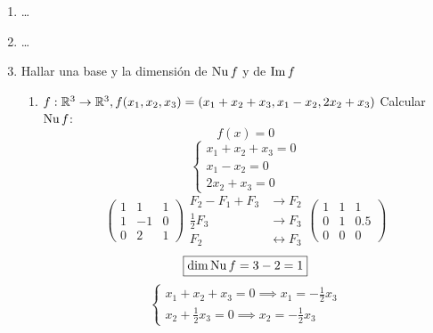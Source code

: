 \documentclass[../practica.root.tex]{subfiles}
\begin{document}
\begin{enumerate}
\begin{enumerate}
          \end{enumerate}
    \item \dots
    \item \dots
    \item Hallar una base y la dimensión de \(\operatorname{Nu} f\) y de \(\operatorname{Im} f\)
          \begin{enumerate}
              \item \( f : \mathbb{R}^3 \to \mathbb{R}^3, f(x_1,x_2,x_3) = (x_1 + x_2 + x_3, x_1 - x_2, 2x_2 + x_3) \)
                    Calcular \(\operatorname{Nu} f\):
                    \[ f(x) = 0 \]
                    \[
                        \begin{cases}
                            x_1 + x_2 + x_3 = 0 \\
                            x_1 - x_2 = 0       \\
                            2x_2 + x_3 = 0
                        \end{cases}
                    \] \[
                        \begin{pmatrix}
                            1 & 1  & 1 \\
                            1 & -1 & 0 \\
                            0 & 2  & 1
                        \end{pmatrix}
                        \begin{array}{rl}
                            F_2 - F_1 + F_3 & \to F_2             \\
                            \frac{1}{2}F_3  & \to F_3             \\
                            F_2             & \leftrightarrow F_3
                        \end{array}
                        \begin{pmatrix}
                            1 & 1 & 1   \\
                            0 & 1 & 0.5 \\
                            0 & 0 & 0
                        \end{pmatrix}
                    \] \[
                        \boxed{\dim\operatorname{Nu}{f} = 3 - 2 = 1}
                    \] \[
                        \begin{cases}
                            x_1 + x_2 + x_3 = 0 \implies x_1 = -\frac{1}{2}x_3 \\
                            x_2 + \frac{1}{2}x_3 = 0 \implies x_2 = -\frac{1}{2}x_3
                        \end{cases}
\]
\end{enumerate}
\end{enumerate}
\end{document}
